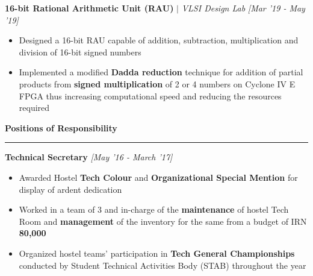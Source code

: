 \documentclass[11pt]{article}%
\begin{document}
{\flushleft \bf \large{16-bit Rational Arithmetic Unit} (RAU)} $\mid$ \textit{VLSI Design Lab} \hfill {{{\em{[Mar '19 - May '19]}} }} \\
\begin{itemize}[leftmargin=*]
    \setlength\itemsep{0.001em}
    \vspace{-1.5mm}
    \item Designed a 16-bit RAU capable of addition, subtraction, multiplication and division of 16-bit signed numbers
    \item Implemented a modified \textbf{Dadda reduction} technique for addition of partial products from \textbf{signed multiplication} of 2 or 4 numbers on Cyclone IV E FPGA thus increasing computational speed and reducing the resources required
\end{itemize}




\begin{center}
\bf{\Large{Positions of Responsibility}}
\end{center}
\vspace{-1mm}
\hrule
{\flushleft \bf \large{Technical Secretary}} \hfill {{{\em{[May '16 - March '17]}} }} \\
\vspace{-6mm}
{}
\vspace{0mm}
\begin{itemize}
    \setlength\itemsep{0.01em}
    \vspace{-2mm}
    \item Awarded Hostel \textbf{Tech Colour} and \textbf{Organizational Special Mention} for display of ardent dedication
    \item Worked in a team of 3 and in-charge of the \textbf{maintenance} of hostel Tech Room and \textbf{management} of the inventory for the same from a budget of IRN \textbf{80,000}
    \item Organized hostel teams' participation in \textbf{Tech General Championships} conducted by Student Technical Activities Body (STAB) throughout the year
\end{itemize}

\vspace{-9pt}
\end{document}
